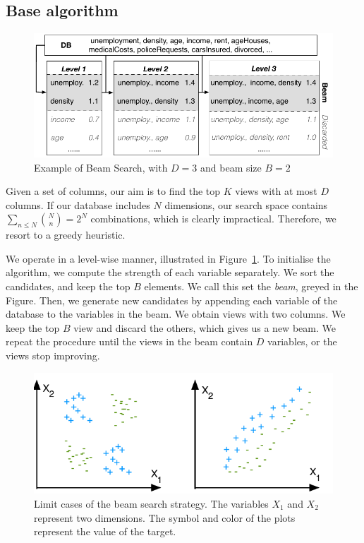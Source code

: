 \subsection{Base algorithm}
\label{sec:base}
\begin{figure}[t!]
\centering
\includegraphics[width=\columnwidth]{images/beam-search}
\caption{Example of Beam Search, with $D=3$ and beam size $B=2$}
\label{pic:beam-search}
\end{figure}
Given a set of columns, our aim is to find the top $K$ views with at most $D$
columns. If our database includes $N$ dimensions, our search space contains
$\sum_{n \leq N} \binom{N}{n} = 2^N$ combinations, which is clearly
impractical. Therefore, we resort to a  greedy heuristic.

We operate in a level-wise manner, illustrated in Figure~\ref{pic:beam-search}.
To initialise the algorithm, we compute the strength of each variable
separately. We sort the candidates, and keep the top $B$ elements. We call this
set the \emph{beam}, greyed in the Figure. Then, we  generate new candidates by
appending each variable of the database to the variables in the beam. We obtain
views with two columns.  We keep the top $B$ view and discard the others, which
gives us a new beam. We repeat the procedure until the views in the beam
contain $D$ variables, or the views stop improving.
\begin{figure}[t!]
\centering
\includegraphics[width=0.8\columnwidth]{images/strength-jump}
\caption{Limit cases of the beam search strategy. The variables $X_1$ and
$X_2$ represent two dimensions. The symbol and color of the plots represent
the value of the target. }
\label{pic:strength-jump}
\end{figure}

